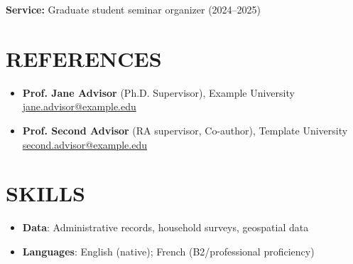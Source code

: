 \documentclass[11pt]{article}
\begin{document}
\textbf{Service:} Graduate student seminar organizer (2024--2025)

\section{{\Large R}EFERENCES}
\begin{itemize}[leftmargin=*, label={}]
  \item \textbf{Prof. Jane Advisor} (Ph.D. Supervisor), Example University \\
  \href{mailto:jane.advisor@example.edu}{jane.advisor@example.edu}
  \item \textbf{Prof. Second Advisor} (RA supervisor, Co-author), Template University \\
  \href{mailto:second.advisor@example.edu}{second.advisor@example.edu}
\end{itemize}

\section{{\Large S}KILLS}
\begin{itemize}
  \item \textbf{Data}: Administrative records, household surveys, geospatial data
  \item \textbf{Languages}: English (native); French (B2/professional proficiency)
\end{itemize}
\end{document}
